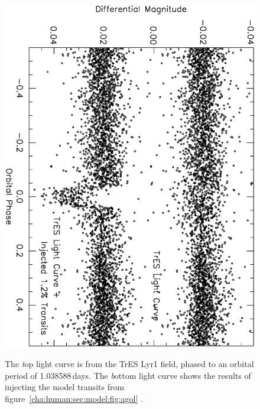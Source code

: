 \begin{figure}
\begin{center}
\centering
\includegraphics[width=.75\textwidth, angle=90]{7_agol_c}\\
\caption[Example of TrES light curve with injected transits]{%
The {\textit top} light curve is from the TrES Lyr1 field, phased to an orbital period of 1.038588\,days. The {\textit bottom} light curve shows the results of injecting the model transits from figure~\ref{cha:human:sec:model:fig:agol}%
.%
}\label{cha:human:sec:model:fig:inject}%
\end{center}
\end{figure}

